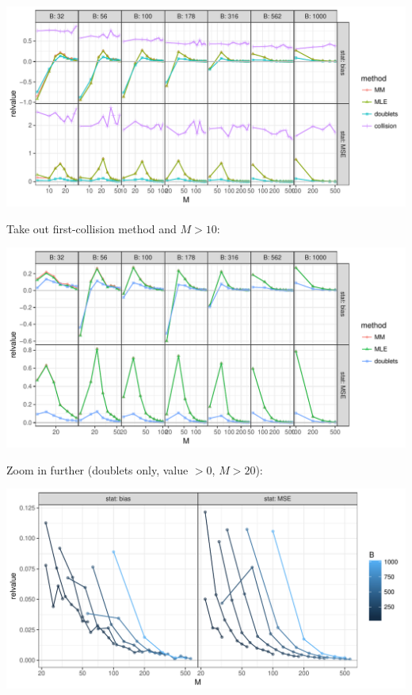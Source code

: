 \documentclass{article}\usepackage[]{graphicx}\usepackage[]{color}
\newenvironment{knitrout}{}{} %
\begin{document}
\begin{knitrout}
\color{fgcolor}
\includegraphics[width=\textwidth]{figure/simplot1-1} 

\end{knitrout}

Take out first-collision method and $M>10$:

\begin{knitrout}
\color{fgcolor}
\includegraphics[width=\textwidth]{figure/simplot2-1} 

\end{knitrout}

Zoom in further (doublets only, value $>0$, $M>20$):

\begin{knitrout}
\color{fgcolor}
\includegraphics[width=\textwidth]{figure/simplot3-1} 

\end{knitrout}
\end{document}
